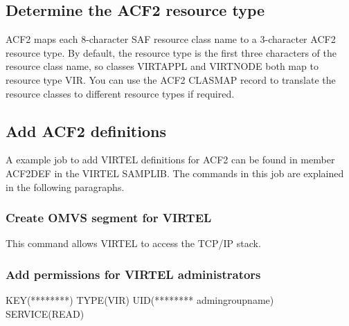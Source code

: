 \documentclass[letterpaper,10pt,english]{sphinxmanual}
\begin{document}
\subsection{Determine the ACF2 resource type}
\label{\detokenize{Installation_Guide:determine-the-acf2-resource-type}}
ACF2 maps each 8-character SAF resource class name to a 3-character ACF2 resource type. By default, the resource type is the first three characters of the resource class name, so classes VIRTAPPL and VIRTNODE both map to resource type VIR. You can use the ACF2 CLASMAP record to translate the resource classes to different resource types if required.


\subsection{Add ACF2 definitions}
\label{\detokenize{Installation_Guide:add-acf2-definitions}}
A example job to add VIRTEL definitions for ACF2 can be found in member ACF2DEF in the VIRTEL SAMPLIB. The commands in this job are explained in the following paragraphs.


\subsubsection{Create OMVS segment for VIRTEL}
\label{\detokenize{Installation_Guide:create-omvs-segment-for-virtel}}
\begin{sphinxVerbatim}[commandchars=\\\{\}]
  
    
\end{sphinxVerbatim}


This command allows VIRTEL to access the TCP/IP stack.


\subsubsection{Add permissions for VIRTEL administrators}
\label{\detokenize{Installation_Guide:add-permissions-for-virtel-administrators}}
\begin{sphinxVerbatim}[commandchars=\\\{\}]
\PYGZdl{}KEY(********) TYPE(VIR) UID(******** admin\PYGZhy{}group\PYGZhy{}name) SERVICE(READ)
\end{sphinxVerbatim}
\end{document}
